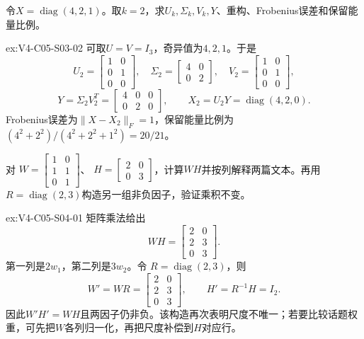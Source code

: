 \begin{SLChapterExercisePairSection}
\begin{exercise}\label{ex:V4-C05-S03-02}
令$X=\operatorname{diag}(4,2,1)$。取$k=2$，求$U_k,\Sigma_k,V_k,Y$、重构、Frobenius误差和保留能量比例。
\end{exercise}
\ifSLFullEdition
{}\label{sol:V4-C05-S03-02}
\begin{chapterexercisesolution}{ex:V4-C05-S03-02}
可取$U=V=I_3$，奇异值为$4,2,1$。于是
\[
U_2=\begin{bmatrix}1&0\\0&1\\0&0\end{bmatrix},
\quad \Sigma_2=\begin{bmatrix}4&0\\0&2\end{bmatrix},
\quad V_2=\begin{bmatrix}1&0\\0&1\\0&0\end{bmatrix},
\]
\[
Y=\Sigma_2V_2^T=\begin{bmatrix}4&0&0\\0&2&0\end{bmatrix},
\qquad
X_2=U_2Y=\operatorname{diag}(4,2,0).
\]
Frobenius误差为$\|X-X_2\|_F=1$，保留能量比例为
$(4^2+2^2)/(4^2+2^2+1^2)=20/21$。
\end{chapterexercisesolution}
\fi

\begin{exercise}\label{ex:V4-C05-S04-01}
对
$W=\begin{bmatrix}1&0\\1&1\\0&1\end{bmatrix}$、
$H=\begin{bmatrix}2&0\\0&3\end{bmatrix}$，计算$WH$并按列解释两篇文本。再用$R=\operatorname{diag}(2,3)$构造另一组非负因子，验证乘积不变。
\end{exercise}
\ifSLFullEdition
{}\label{sol:V4-C05-S04-01}
\begin{chapterexercisesolution}{ex:V4-C05-S04-01}
矩阵乘法给出
\[
WH=\begin{bmatrix}2&0\\2&3\\0&3\end{bmatrix}.
\]
第一列是$2w_1$，第二列是$3w_2$。令
$R=\operatorname{diag}(2,3)$，则
\[
W'=WR=\begin{bmatrix}2&0\\2&3\\0&3\end{bmatrix},
\qquad
H'=R^{-1}H=I_2.
\]
因此$W'H'=WH$且两因子仍非负。该构造再次表明尺度不唯一；若要比较话题权重，可先把$W$各列归一化，再把尺度补偿到$H$对应行。
\end{chapterexercisesolution}
\fi


\end{SLChapterExercisePairSection}
